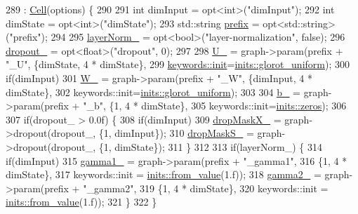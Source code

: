\begin{DoxyCode}
289       : \hyperlink{classmarian_1_1rnn_1_1Cell_acc392c8adfb002c17993f02e6d3085a6}{Cell}(options) \{
290 
291     \textcolor{keywordtype}{int} dimInput = opt<int>(\textcolor{stringliteral}{"dimInput"});
292     \textcolor{keywordtype}{int} dimState = opt<int>(\textcolor{stringliteral}{"dimState"});
293     std::string \hyperlink{namespacemarian_1_1keywords_aa2cadd13ac94307ff92c68efb57264ac}{prefix} = opt<std::string>(\textcolor{stringliteral}{"prefix"});
294 
295     \hyperlink{classmarian_1_1rnn_1_1FastLSTM_a2f5806e02a37ee6b63330ac6b4c6dc7e}{layerNorm\_} = opt<bool>(\textcolor{stringliteral}{"layer-normalization"}, \textcolor{keyword}{false});
296     \hyperlink{classmarian_1_1rnn_1_1FastLSTM_a12a295492bb6fdd495109988a17c6996}{dropout\_} = opt<float>(\textcolor{stringliteral}{"dropout"}, 0);
297 
298     \hyperlink{classmarian_1_1rnn_1_1FastLSTM_a94423205eb1b2cedf8a1c9e48f5b9c0e}{U\_} = graph->param(prefix + \textcolor{stringliteral}{"\_U"}, \{dimState, 4 * dimState\},
299                       \hyperlink{namespacemarian_1_1keywords_afdd3807e3d6fe2bc979d11fa0cf3ee3e}{keywords::init}=\hyperlink{namespacemarian_1_1inits_a8838c47537f434b855491cd3ed97ccd1}{inits::glorot\_uniform});
300     \textcolor{keywordflow}{if}(dimInput)
301       \hyperlink{classmarian_1_1rnn_1_1FastLSTM_ad0953564d51fae532551b75bc51cfe0d}{W\_} = graph->param(prefix + \textcolor{stringliteral}{"\_W"}, \{dimInput, 4 * dimState\},
302                         keywords::init=\hyperlink{namespacemarian_1_1inits_a8838c47537f434b855491cd3ed97ccd1}{inits::glorot\_uniform});
303 
304     \hyperlink{classmarian_1_1rnn_1_1FastLSTM_a4b637d17c49e8d687f1a4b3747d0e191}{b\_} = graph->param(prefix + \textcolor{stringliteral}{"\_b"}, \{1, 4 * dimState\},
305                       keywords::init=\hyperlink{namespacemarian_1_1inits_a1bd34fd256e3df7bb1e27955a7f2b359}{inits::zeros});
306 
307     \textcolor{keywordflow}{if}(dropout\_ > 0.0f) \{
308       \textcolor{keywordflow}{if}(dimInput)
309         \hyperlink{classmarian_1_1rnn_1_1FastLSTM_a0f85818d69d5fc264723e09568bf83a4}{dropMaskX\_} = graph->dropout(dropout\_, \{1, dimInput\});
310       \hyperlink{classmarian_1_1rnn_1_1FastLSTM_adbc5704ab5b1cc30e29861e9653bd0a3}{dropMaskS\_} = graph->dropout(dropout\_, \{1, dimState\});
311     \}
312 
313     \textcolor{keywordflow}{if}(layerNorm\_) \{
314       \textcolor{keywordflow}{if}(dimInput)
315         \hyperlink{classmarian_1_1rnn_1_1FastLSTM_a3b3ec7656304f6bb651a7d178eafc515}{gamma1\_} = graph->param(prefix + \textcolor{stringliteral}{"\_gamma1"},
316                                \{1, 4 * dimState\},
317                                keywords::init = \hyperlink{namespacemarian_1_1inits_a03723a199ab72a38a13b2b8644e8e1c2}{inits::from\_value}(1.f));
318       \hyperlink{classmarian_1_1rnn_1_1FastLSTM_abbe09f956268903da106fb93de6a9ae5}{gamma2\_} = graph->param(prefix + \textcolor{stringliteral}{"\_gamma2"},
319                              \{1, 4 * dimState\},
320                              keywords::init = \hyperlink{namespacemarian_1_1inits_a03723a199ab72a38a13b2b8644e8e1c2}{inits::from\_value}(1.f));
321     \}
322   \}
\end{DoxyCode}


